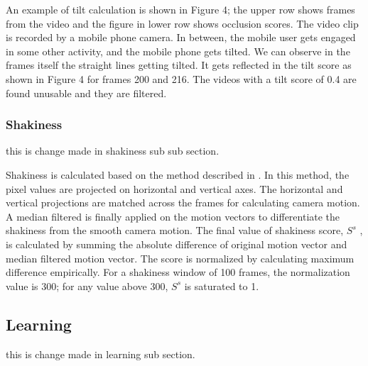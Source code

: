 \documentclass{new}
\begin{document}
An example of tilt calculation is shown in Figure 4; the upper
row shows frames from the video and the figure in lower row shows
occlusion scores. The video clip is recorded by a mobile phone
camera. In between, the mobile user gets engaged in some other
activity, and the mobile phone gets tilted. We can observe in the
frames itself the straight lines getting tilted. It gets reflected in the
tilt score as shown in Figure 4 for frames 200 and 216. The videos
with a tilt score of 0.4 are found unusable and they are filtered.

\subsubsection{Shakiness}
this is change made in shakiness sub sub section.

Shakiness is calculated based on the method described in \cite{4}.
In this method, the pixel values are projected on horizontal and
vertical axes. The horizontal and vertical projections are matched
across the frames for calculating camera motion. A median filtered
is finally applied on the motion vectors to differentiate the shakiness from the smooth camera motion. The final value of shakiness
score, $S^s$ , is calculated by summing the absolute difference of original motion vector and median filtered motion vector. The score is
normalized by calculating maximum difference empirically. For a
shakiness window of 100 frames, the normalization value is 300;
for any value above 300, $S^s$ is saturated to 1.



\subsection{Learning}
this is change made in learning sub section.
\end{document}
